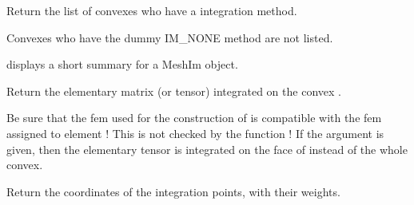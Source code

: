 \documentclass[a4paper,11pt,english]{sphinxmanual}
\begin{document}
\begin{fulllineitems}

\begin{fulllineitems}
\label{\detokenize{python/cmdref_MeshIm:getfem.MeshIm.convex_index}}
Return the list of convexes who have a integration method.

Convexes who have the dummy IM\_NONE method are not listed.

\end{fulllineitems}


\begin{fulllineitems}
\label{\detokenize{python/cmdref_MeshIm:getfem.MeshIm.display}}
displays a short summary for a MeshIm object.

\end{fulllineitems}


\begin{fulllineitems}
\label{\detokenize{python/cmdref_MeshIm:getfem.MeshIm.eltm}}
Return the elementary matrix (or tensor) integrated on the convex .


Be sure that the fem used for the construction of  is compatible
with the fem assigned to element  ! This is not checked by the
function ! If the argument  is given, then the elementary tensor
is integrated on the face  of  instead of the whole convex.

\end{fulllineitems}


\begin{fulllineitems}
\label{\detokenize{python/cmdref_MeshIm:getfem.MeshIm.im_nodes}}
Return the coordinates of the integration points, with their weights.


\end{fulllineitems}
\end{fulllineitems}
\end{document}
